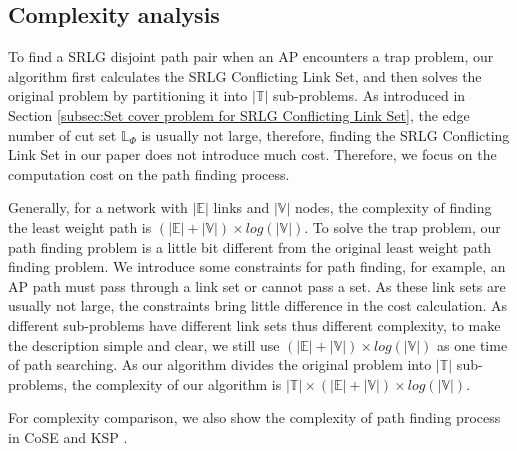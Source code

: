 \subsection{Complexity analysis}
\label{subsec:Complexity analysis}
To find a SRLG disjoint path pair when an AP encounters a trap problem, our algorithm first calculates the SRLG Conflicting Link Set, and then solves the original problem by partitioning it into $|\mathbb{T}|$ sub-problems. As introduced in Section \ref{subsec:Set cover problem for SRLG Conflicting Link Set},  the edge number of cut set $\mathbb{L}_{\Phi}$ is usually not large, therefore, finding the SRLG Conflicting Link Set in our paper does not introduce much cost. Therefore, we focus on the computation cost on the path finding process.

Generally, for a network with $|\mathbb{E}|$ links and $|\mathbb{V}|$ nodes, the complexity of finding the least weight path is $(|\mathbb{E}|+|\mathbb{V}|)\times log(|\mathbb{V}|)$. To solve the trap problem, our path finding problem is a little bit different from the original least weight path finding problem. We introduce some constraints for path finding, for example, an AP path must pass through a link set or cannot pass a set. As these link sets are usually not large, the constraints bring little  difference in the cost calculation. As different sub-problems have different link sets thus different complexity, to make the description simple and clear, we still use $(|\mathbb{E}|+|\mathbb{V}|)\times log(|\mathbb{V}|)$ as one time of path searching. As our algorithm divides the original problem into $|\mathbb{T}|$ sub-problems, the complexity of our algorithm is $|\mathbb{T}|\times(|\mathbb{E}|+|\mathbb{V}|)\times log(|\mathbb{V}|)$.

For complexity comparison, we also show the complexity of path finding process in  CoSE \cite{rostami2007cose} and KSP \cite{eppstein1998finding}.

